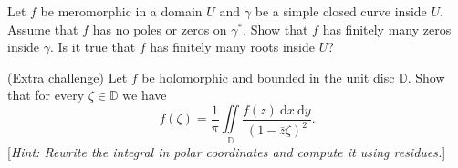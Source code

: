 \documentclass[answers]{exam}
\begin{document}
\begin{questions}
\question%
Let $f$ be meromorphic in a domain $U$ and $\gamma$ be a simple closed curve inside $U$. Assume that $f$ has no poles or zeros on $\gamma^*$. Show that $f$ has finitely many zeros inside $\gamma$. Is it true that $f$ has finitely many roots inside $U$?



\question%
(Extra challenge)
Let $f$ be holomorphic and bounded in the unit disc $\mathbb D$. Show that for every $\zeta\in\mathbb D$ we have \[
	f(\zeta)=\frac1\pi\iint\limits_{\mathbb D}\frac{f(z)\:\mathrm dx\:\mathrm dy}{(1-\bar z\zeta)^2}.
\] [\emph{Hint: Rewrite the integral in polar coordinates and compute it using residues.}]

\end{questions}
\end{document}
